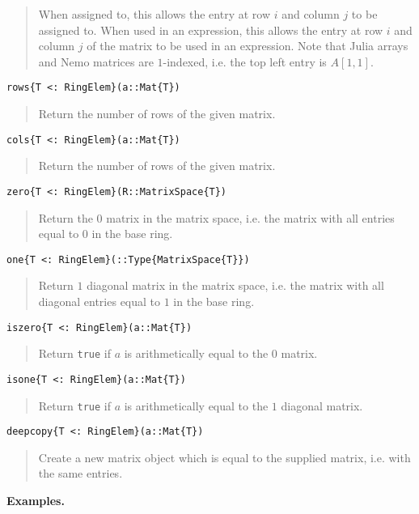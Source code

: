 \documentclass[a4paper,10pt]{article}
\newcommand{\code}{\lstinline}
\newcommand{\desc}[1]{\vspace{-3mm}\begin{quote}#1\end{quote}}
\begin{document}
\desc{When assigned to, this allows the entry at row $i$ and column $j$ to be assigned
to. When used in an expression, this allows the entry at row $i$ and column $j$ of
the matrix to be used in an expression. Note that Julia arrays and Nemo matrices are
$1$-indexed, i.e. the top left entry is $A[1, 1]$.}

\begin{lstlisting}
rows{T <: RingElem}(a::Mat{T})
\end{lstlisting}

\desc{Return the number of rows of the given matrix.}

\begin{lstlisting}
cols{T <: RingElem}(a::Mat{T})
\end{lstlisting}

\desc{Return the number of rows of the given matrix.}

\begin{lstlisting}
zero{T <: RingElem}(R::MatrixSpace{T})
\end{lstlisting}

\desc{Return the $0$ matrix in the matrix space, i.e. the matrix with all entries
equal to $0$ in the base ring.}

\begin{lstlisting}
one{T <: RingElem}(::Type{MatrixSpace{T}})
\end{lstlisting}

\desc{Return $1$ diagonal matrix in the matrix space, i.e. the matrix with all
diagonal entries equal to $1$ in the base ring.}

\begin{lstlisting}
iszero{T <: RingElem}(a::Mat{T})
\end{lstlisting}

\desc{Return \code{true} if $a$ is arithmetically equal to the $0$ matrix.}

\begin{lstlisting}
isone{T <: RingElem}(a::Mat{T})
\end{lstlisting}

\desc{Return \code{true} if $a$ is arithmetically equal to the $1$ diagonal
matrix.}

\begin{lstlisting}
deepcopy{T <: RingElem}(a::Mat{T})
\end{lstlisting}

\desc{Create a new matrix object which is equal to the supplied matrix, i.e.
with the same entries.}

\textbf{Examples.}
\end{document}
